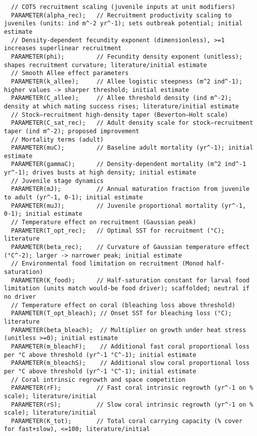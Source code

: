 \begin{lstlisting}
  // COTS recruitment scaling (juvenile inputs at unit modifiers)
  PARAMETER(alpha_rec);   // Recruitment productivity scaling to juveniles (units: ind m^-2 yr^-1); sets outbreak potential; initial estimate
  // Density-dependent fecundity exponent (dimensionless), >=1 increases superlinear recruitment
  PARAMETER(phi);         // Fecundity density exponent (unitless); shapes recruitment curvature; literature/initial estimate
  // Smooth Allee effect parameters
  PARAMETER(k_allee);     // Allee logistic steepness (m^2 ind^-1); higher values -> sharper threshold; initial estimate
  PARAMETER(C_allee);     // Allee threshold density (ind m^-2); density at which mating success rises; literature/initial estimate
  // Stock–recruitment high-density taper (Beverton–Holt scale)
  PARAMETER(C_sat_rec);   // Adult density scale for stock–recruitment taper (ind m^-2); proposed improvement
  // Mortality terms (adult)
  PARAMETER(muC);         // Baseline adult mortality (yr^-1); initial estimate
  PARAMETER(gammaC);      // Density-dependent mortality (m^2 ind^-1 yr^-1); drives busts at high density; initial estimate
  // Juvenile stage dynamics
  PARAMETER(mJ);          // Annual maturation fraction from juvenile to adult (yr^-1, 0-1); initial estimate
  PARAMETER(muJ);         // Juvenile proportional mortality (yr^-1, 0-1); initial estimate
  // Temperature effect on recruitment (Gaussian peak)
  PARAMETER(T_opt_rec);   // Optimal SST for recruitment (°C); literature
  PARAMETER(beta_rec);    // Curvature of Gaussian temperature effect (°C^-2); larger -> narrower peak; initial estimate
  // Environmental food limitation on recruitment (Monod half-saturation)
  PARAMETER(K_food);      // Half-saturation constant for larval food limitation (units match would-be food driver); scaffolded; neutral if no driver
  // Temperature effect on coral (bleaching loss above threshold)
  PARAMETER(T_opt_bleach); // Onset SST for bleaching loss (°C); literature
  PARAMETER(beta_bleach);  // Multiplier on growth under heat stress (unitless >=0); initial estimate
  PARAMETER(m_bleachF);    // Additional fast coral proportional loss per °C above threshold (yr^-1 °C^-1); initial estimate
  PARAMETER(m_bleachS);    // Additional slow coral proportional loss per °C above threshold (yr^-1 °C^-1); initial estimate
  // Coral intrinsic regrowth and space competition
  PARAMETER(rF);          // Fast coral intrinsic regrowth (yr^-1 on % scale); literature/initial
  PARAMETER(rS);          // Slow coral intrinsic regrowth (yr^-1 on % scale); literature/initial
  PARAMETER(K_tot);       // Total coral carrying capacity (% cover for fast+slow), <=100; literature/initial

\end{lstlisting}
